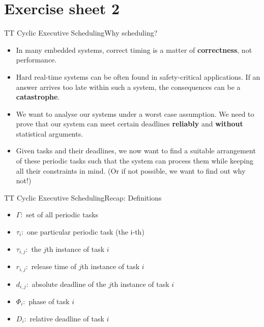 \section{Exercise sheet 2}

\setcounter{task}{1}

\begin{frame}{TT Cyclic Executive Scheduling}{Why scheduling?}
    \begin{itemize}
        \item In many embedded systems, correct timing is a matter of \textbf{correctness}, not performance.
        \item Hard real-time systems can be often found in safety-critical applications. If an answer arrives too late within such a system, the consequences can be a \textbf{catastrophe}.
        \item We want to analyse our systems under a worst case assumption. We need to prove that our system can meet certain deadlines \textbf{reliably} and \textbf{without} statistical arguments.
        \item Given tasks and their deadlines, we now want to find a suitable arrangement of these periodic tasks such that the system can process them while keeping all their constraints in mind. (Or if not possible, we want to find out why not!)
    \end{itemize}
\end{frame}

\begin{frame}{TT Cyclic Executive Scheduling}{Recap: Definitions}
    \begin{itemize}
        \item $\Gamma:$ set of all periodic tasks
        \item $\tau_i:$ one particular periodic task (the i-th)
        \item $\tau_{i,j}:$ the $j$th instance of task $i$
        \item $r_{i,j}:$ release time of $j$th instance of task $i$
        \item $d_{i,j}:$ absolute deadline of the $j$th instance of task $i$
        \item $\Phi_i:$ phase of task $i$
        \item $D_i:$ relative deadline of task $i$
    \end{itemize}
\end{frame}


